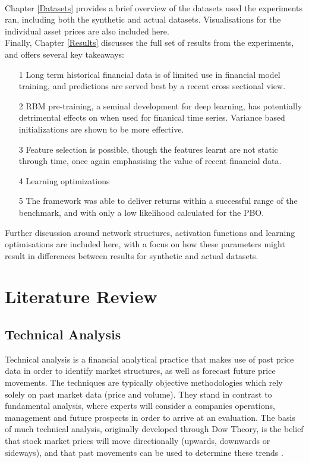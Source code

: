\documentclass[a4paper,11pt,oneside]{article}
\theoremstyle{plain}
\theoremstyle{definition}
\begin{document}
	~\\\newline
	Chapter \ref{Datasets} provides a brief overview of the datasets used the experiments ran, including both the synthetic and actual datasets. Visualisations for the individual asset prices are also included here.
	~\\\newline
	Finally, Chapter \ref{Results} discusses the full set of results from the experiments, and offers several key takeaways:
	\begin{itemize}
		\item[1] Long term historical financial data is of limited use in financial model training, and predictions are served best by a recent cross sectional view.
		\item[2] RBM pre-training, a seminal development for deep learning, has potentially detrimental effects on when used for finanical time series. Variance based initializations are shown to be more effective.
		\item[3] Feature selection is possible, though the features learnt are not static through time, once again emphasising the value of recent financial data.	 
		\item[4] Learning optimizations 
		\item[5] The framework was able to deliver returns within a successful range of the benchmark, and with only a low likelihood calculated for the PBO.
	\end{itemize}
	Further discussion around network structures, activation functions and learning optimisations are included here, with a focus on how these parameters might result in differences between results for synthetic and actual datasets.
	
	
	\newpage
	\section{Literature Review}\label{lr_LiteratureReview}
	\subsection{Technical Analysis}\label{lr_TechnicalAnalysis}
	
	Technical analysis is a financial analytical practice that makes use of past price data in order to identify market 
	structures, as well as forecast future price movements. The techniques are typically objective methodologies 
	which rely solely on past market data (price and volume). They stand in contrast to fundamental analysis, where 
	experts will consider a companies operations, management and future prospects in order to arrive at an evaluation. 
	The basis of much technical analysis, originally developed through Dow Theory, is the belief that stock market 
	prices will move directionally (upwards, downwards or sideways), and that past movements can be used to 
	determine these trends  \cite {Murphy}.
	\hfill \break 
	
\end{document}

